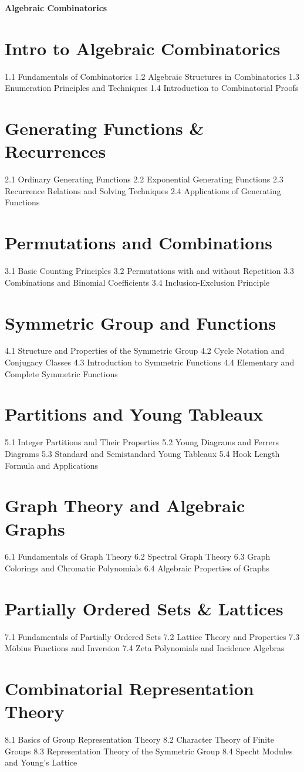 {\LARGE \bf{Algebraic Combinatorics}}
\section{Intro to Algebraic Combinatorics}
1.1 Fundamentals of Combinatorics
1.2 Algebraic Structures in Combinatorics
1.3 Enumeration Principles and Techniques
1.4 Introduction to Combinatorial Proofs
\section{Generating Functions \& Recurrences}
2.1 Ordinary Generating Functions
2.2 Exponential Generating Functions
2.3 Recurrence Relations and Solving Techniques
2.4 Applications of Generating Functions
\section{Permutations and Combinations}
3.1 Basic Counting Principles
3.2 Permutations with and without Repetition
3.3 Combinations and Binomial Coefficients
3.4 Inclusion-Exclusion Principle
\section{Symmetric Group and Functions}
4.1 Structure and Properties of the Symmetric Group
4.2 Cycle Notation and Conjugacy Classes
4.3 Introduction to Symmetric Functions
4.4 Elementary and Complete Symmetric Functions
\section{Partitions and Young Tableaux}
5.1 Integer Partitions and Their Properties
5.2 Young Diagrams and Ferrers Diagrams
5.3 Standard and Semistandard Young Tableaux
5.4 Hook Length Formula and Applications
\section{Graph Theory and Algebraic Graphs}
6.1 Fundamentals of Graph Theory
6.2 Spectral Graph Theory
6.3 Graph Colorings and Chromatic Polynomials
6.4 Algebraic Properties of Graphs
\section{Partially Ordered Sets \& Lattices}
7.1 Fundamentals of Partially Ordered Sets
7.2 Lattice Theory and Properties
7.3 Möbius Functions and Inversion
7.4 Zeta Polynomials and Incidence Algebras
\section{Combinatorial Representation Theory}
8.1 Basics of Group Representation Theory
8.2 Character Theory of Finite Groups
8.3 Representation Theory of the Symmetric Group
8.4 Specht Modules and Young's Lattice
